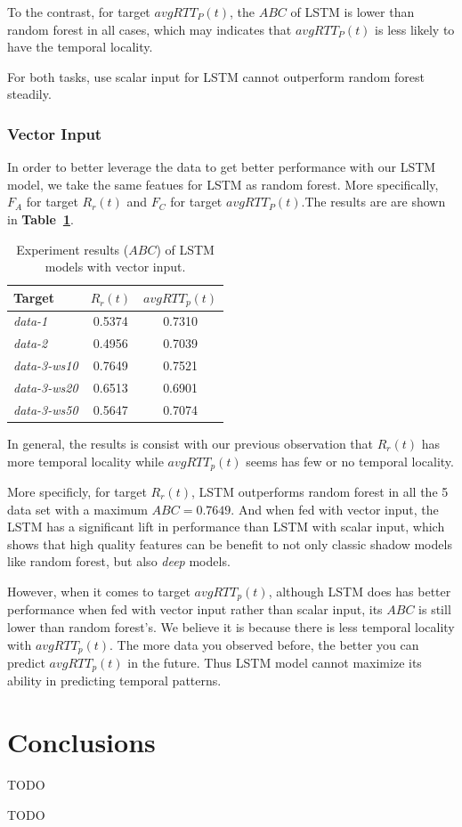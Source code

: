 \documentclass[sigconf]{acmart}
\begin{document}
	To the contrast, for target $avgRTT_P(t)$, the $ABC$ of LSTM is lower than random forest in all cases, which may indicates that $avgRTT_P(t)$ is less likely to have the temporal locality.
	
	For both tasks, use scalar input for LSTM cannot outperform random forest steadily.
	
	\subsubsection{Vector Input}
	In order to better leverage the data to get better performance with our LSTM model, we take the same featues for LSTM as random forest. More specifically, $F_A$ for target $R_r(t)$ and $F_C$ for target $avgRTT_P(t)$.The results are are shown in \textbf{Table~\ref{tab:lstm-vector}}.
	\begin{table}[t]
		\centering
		\begin{tabular}{lcc}
			\toprule
			{Target} &{$R_r(t)$}&{$avgRTT_p(t)$} \\
			\midrule
			\textit{data-1}& 0.5374 & 0.7310 \\
			\textit{data-2}& 0.4956& 0.7039     \\
			\textit{data-3-ws10}& 0.7649 & 0.7521 \\
			\textit{data-3-ws20}& 0.6513& 0.6901    \\
			\textit{data-3-ws50}& 0.5647& 0.7074  \\
			\bottomrule	
		\end{tabular}
		\caption{ Experiment results ($ABC$) of LSTM models with vector input. }
		\label{tab:lstm-vector}
	\end{table}
	
	In general, the results is consist with our previous observation that $R_r(t)$ has more temporal locality while $avgRTT_p(t)$ seems has few or no temporal locality.
	
	More specificly, for target $R_r(t)$, LSTM outperforms random forest in all the 5 data set with a maximum $ABC=0.7649$. And when fed with vector input, the LSTM has a significant lift in performance than LSTM with scalar input, which shows that high quality features can be benefit to not only classic shadow models like random forest, but also \textit{deep} models.
	
	However, when it comes to target $avgRTT_p(t)$, although LSTM does has better performance when fed with vector input rather than scalar input, its $ABC$ is still lower than random forest's. We believe it is because there is less temporal locality with $avgRTT_p(t)$. The more data you observed before, the better you can predict $avgRTT_p(t)$ in the future. Thus LSTM model cannot maximize its ability in predicting temporal patterns.
	\section{Conclusions}
	TODO
	
	\begin{acks}
		TODO
	\end{acks}
	
	
	
	
	 
	
\end{document}
